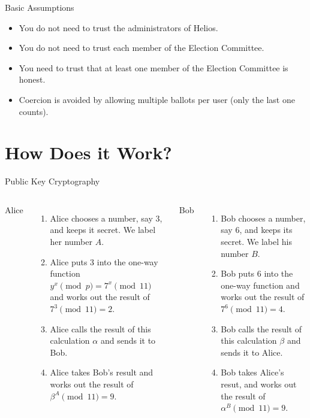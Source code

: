 \documentclass[utf8]{beamer}
\begin{document}
\begin{frame}{Basic Assumptions}

\begin{itemize}
\item You do not need to trust the administrators of Helios.
\item You do not need to trust each member of the Election Committee.
\item You need to trust that at least one member of the Election
  Committee is honest.
\item Coercion is avoided by allowing multiple ballots per user (only
  the last one counts).
\end{itemize}

\end{frame}

\section{How Does it Work?}

\begin{frame}{Public Key Cryptography}

 \begin{columns}[t]
   Alice
   \begin{enumerate}
   \item<1-> Alice chooses a number, say 3, and keeps it secret. We
     label her number $A$.
   \item<2-> Alice puts 3 into the one-way function $y^x\pmod p =
     7^x\pmod 11$ and works out the result of $7^3\pmod{11} = 2$.
   \item<3-> Alice calls the result of this calculation $\alpha$ and
     sends it to Bob.
   \item<4-> Alice takes Bob's result and works out the result of
     $\beta^A\pmod{11} = 9$.
   \end{enumerate}

  Bob
  \begin{enumerate}
  \item<1-> Bob chooses a number, say 6, and keeps its secret. We
    label his number $B$.
  \item<2-> Bob puts 6 into the one-way function and works out the
    result of $7^6\pmod{11} = 4$.
  \item<3-> Bob calls the result of this calculation $\beta$ and
    sends it to Alice.
  \item<4-> Bob takes Alice's resut, and works out the result of
    $\alpha^B\pmod{11} = 9$.
  \end{enumerate}  
\end{columns}

\end{frame}
\end{document}
